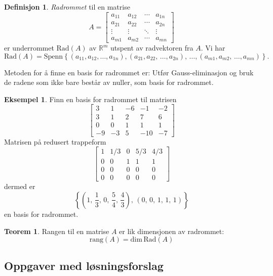 \documentclass[11pt]{article}
\theoremstyle{definition}
\newtheorem{mindef}{Definisjon}[section]
\newenvironment{fmindef}
{\begin{mdframed}[style=minstil]\begin{mindef}}
		{\end{mindef}\end{mdframed}}
\theoremstyle{definition}
\newtheorem{mitteks}{Eksempel}[section]
\theoremstyle{definition}
\theoremstyle{definition}
\newtheorem{teo}{Teorem}[section]
\newenvironment{fteo}
{\begin{mdframed}[style=minstil]\begin{teo}}
		{\end{teo}\end{mdframed}}
\theoremstyle{definition}
\theoremstyle{definition}
\begin{document}
		\begin{fmindef}
			\textit{Radrommet} til en matrise
			\[A=\left[\begin{array}{cccc} 
			a_{11} & a_{12} & \cdots & a_{1n} \\
			a_{21} & a_{22} & \cdots & a_{2n} \\
			\vdots & \vdots & \ddots & \vdots \\
			a_{m1} & a_{m2} & \cdots & a_{mn}
			\end{array} \right]\]
			er underrommet \(\text{Rad}(A) \) av \(\mathbb{R}^m \) utspent av radvektoren fra \(A\). Vi har
			\[\text{Rad}(A)=\text{Spenn}\left\lbrace
			(a_{11},a_{12},\ldots,a_{1n} ),(a_{21},a_{22},\,\ldots,a_{2n}),\,\ldots
			,(a_{m1},a_{m2},\,\ldots,a_{mn})
			 \right\rbrace.  \]
			
			Metoden for å finne en basis for radrommet er: Utfør Gauss-eliminasjon og bruk de radene som ikke bare består av nuller, som basis for radrommet.
		\end{fmindef}
		
		\begin{mitteks}
			Finn en basis for radrommet til matrisen 
			\[\left[\begin{array}{rrrrr} 
			3 & 1 &-6 &-1  &-2 \\
			3 & 1 & 2 & 7  & 6 \\
			0 & 0 & 1 & 1  & 1 \\
		   -9 &-3 & 5 &-10 &-7
			\end{array} \right] \]
			Matrisen på redusert trappeform
			\[\left[\begin{array}{rrrrr} 
			1 & 1/3 & 0 & 5/3 & 4/3 \\
			0 & 0 & 1 & 1 & 1 \\
			0 & 0 & 0 & 0 & 0 \\
			0 & 0 & 0 & 0 & 0
			\end{array} \right]\]
			dermed er
			\[\left\lbrace\left( 1,\,\frac{1}{3},\,0,\,\frac{5}{4},\,\frac{4}{3} \right),\,(0,\,0,\,1,\,1,\,1)  \right\rbrace \]
			en basis for radrommet.
		\end{mitteks}
		
		\begin{fteo}
			Rangen til en matrise \(A\) er lik dimensjonen av radrommet:
			\[\text{rang}(A)=\text{dim}\,\text{Rad}(A) \]
		\end{fteo}
		
		\newpage
		\subsection{Oppgaver med løsningsforslag}
\end{document}
